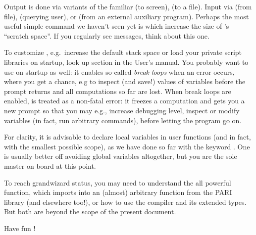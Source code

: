 Output is done via variants of the familiar  (to screen),
 (to a file). Input via  (from file), 
(querying user), or  (from an external auxiliary program).
Perhaps the most useful simple command we haven't seen yet is
 which increase the size of 's ``scratch space''. If
you regularly see  messages, think about this
one.

To customize , e.g.~increase the default stack space or load your
private script libraries on startup, look up 
section in the User's manual. You probably want to use  on startup
as well: it enables so-called \emph{break loops} when an error occurs, where
you get a chance, e.g to inspect (and save!) values of variables before the
prompt returns and all computations so far are lost. When break loops
are enabled,  is treated as a non-fatal error: it freezes a
computation and gets you a new prompt so that you may e.g., increase debugging
level, inspect or modify variables (in fact, run arbitrary commands), before
letting the program go on.

For clarity, it is advisable  to declare local variables in user functions
(and in fact, with the smallest possible scope), as we have done so far with
the keyword . One is usually better off avoiding global variables
altogether, but you are the sole master on board at this point.

To reach grandwizard status, you may need to understand the all powerful
 function, which imports into  an (almost) arbitrary
function from the PARI library (and elsewhere too!), or how to use the
 compiler and its extended types. But both are beyond the scope of
the present document.

Have fun !
\bye
